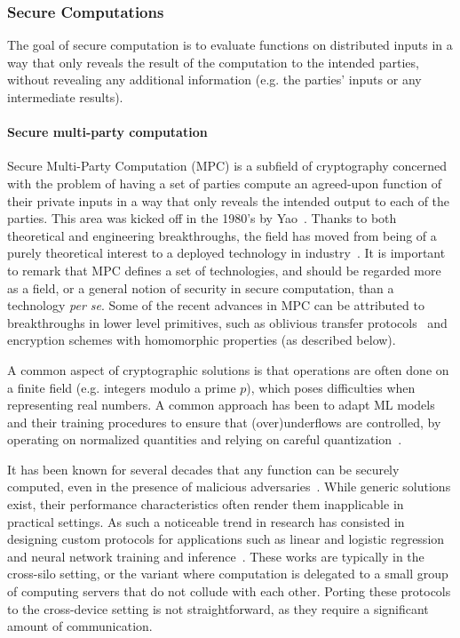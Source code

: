 \documentclass[11pt]{article}
\begin{document}
\subsubsection{Secure Computations}
\label{sssec:secure_computations}

The goal of secure computation is to evaluate functions on distributed inputs in a way that only reveals the result of the computation to the intended parties, without revealing any additional information (e.g. the parties' inputs or any intermediate results). 

\paragraph{Secure multi-party computation}

Secure Multi-Party Computation (MPC) is a subfield of cryptography concerned with the problem of having a set of parties compute an agreed-upon function of their private inputs in a way that only reveals the intended output to each of the parties. This area was kicked off in the 1980’s by Yao~\cite{DBLP:conf/focs/Yao86}.  Thanks to both theoretical and engineering breakthroughs, the field has moved from being of a purely theoretical interest to a deployed technology in industry~\cite{DBLP:conf/fc/BogetoftCDGJKNNNPST09,DBLP:conf/fc/BogdanovTW12,DBLP:conf/secdev/LapetsVBJV16,araki2016high,DBLP:conf/eurocrypt/FurukawaLNW17,DBLP:journals/iacr/IonKNPSSSY17,DBLP:journals/iacr/IonKNPRSSSY19}. It is important to remark that MPC defines a set of technologies, and should be regarded more as a field, or a general notion of security in secure computation, than a technology \textit{per se}. Some of the recent advances in MPC can be attributed to breakthroughs in lower level primitives, such as oblivious transfer protocols~\cite{IKNP} and encryption schemes with homomorphic properties (as described below). 

A common aspect of cryptographic solutions is that operations are often done on a finite field (e.g. integers modulo a prime $p$), which poses difficulties when representing real numbers. A common approach has been to adapt ML models and their training procedures to ensure that (over)underflows are controlled, by operating on normalized quantities and relying on careful quantization~\cite{GasconSB0DZE17, quotient, gbdllnwCN, DBLP:conf/crypto/BourseMMP18}.

It has been known for several decades that any function can be securely computed, even in the presence of malicious adversaries~\cite{goldreich87}.
While generic solutions exist, their performance characteristics often render them inapplicable in practical settings.  As such a noticeable trend in research has consisted in designing custom protocols for applications such as linear and logistic regression~\cite{DBLP:conf/sp/NikolaenkoWIJBT13,GasconSB0DZE17, secureml} and neural network training and inference~\cite{secureml, quotient, bedkSE}. These works are typically in the cross-silo setting, or the variant where computation is delegated to a small group of computing servers that do not collude with each other. Porting these protocols to the cross-device setting is not straightforward, as they require a significant amount of communication.
\end{document}
